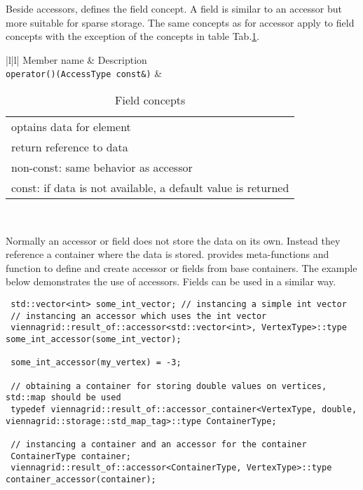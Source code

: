  Beside accessors, {\ViennaGrid} defines the field concept. A field is similar to an accessor but more suitable for sparse storage. The same concepts as for accessor apply to field concepts with the exception of the concepts in table Tab.\ref{tab:field-concepts}.
 
 \begin{table}[tb]
 \begin{center}
  \begin{tabular}{|l|l|}
   \hline
   Member name & Description \\
   \hline
   \lstinline|operator()(AccessType const&)| & \begin{tabular}{l} optains data for element \\ return reference to data \\ non-const: same behavior as accessor \\ const: if data is not available, a default value is returned \end{tabular} \\
   \hline
  \end{tabular}
 \end{center}
 \caption{Field concepts}
 \label{tab:field-concepts}
 \end{table}
 
 Normally an accessor or field does not store the data on its own. Instead they reference a container where the data is stored. {\ViennaGrid} provides meta-functions and function to define and create accessor or fields from base containers. The example below demonstrates the use of {\ViennaGrid} accessors. Fields can be used in a similar way.
 
 \begin{lstlisting}
 std::vector<int> some_int_vector; // instancing a simple int vector
 // instancing an accessor which uses the int vector
 viennagrid::result_of::accessor<std::vector<int>, VertexType>::type some_int_accessor(some_int_vector);
 
 some_int_accessor(my_vertex) = -3;
 
 // obtaining a container for storing double values on vertices, std::map should be used
 typedef viennagrid::result_of::accessor_container<VertexType, double, viennagrid::storage::std_map_tag>::type ContainerType;
 
 // instancing a container and an accessor for the container
 ContainerType container;
 viennagrid::result_of::accessor<ContainerType, VertexType>::type container_accessor(container);
\end{lstlisting}
